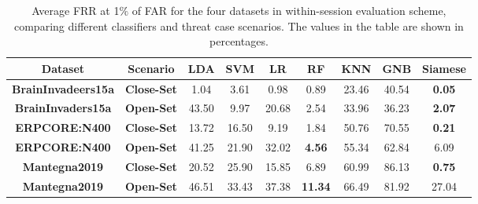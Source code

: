 \begin{table}[ht]
\caption{\large{Average FRR at 1$\%$ of FAR for the four datasets in within-session evaluation scheme, comparing different classifiers and  threat case scenarios. The values in the table are shown in percentages.}}

\label{tab:Table 3}
\renewcommand\arraystretch{1.2}
\resizebox{\textwidth}{!}
    {
\begin{tabular}{cc|ccccccc}

\hline

\rule{0pt}{25pt} \textbf{Dataset} & \textbf{Scenario} & \textbf{LDA} & \textbf{SVM} & \textbf{LR} & \textbf{RF} & \textbf{KNN} & \textbf{GNB} & \textbf{Siamese}\\

\hline
\rule{0pt}{25pt} \textbf{BrainInvadeers15a} & \textbf{Close-Set} & 1.04 & 3.61 & 0.98 & 0.89 & 23.46 & 40.54 & 
\textbf{0.05}\\
\rule{0pt}{25pt} \textbf{BrainInvaders15a} & \textbf{Open-Set}& 43.50 & 9.97 & 20.68 & 2.54 & 33.96 & 36.23 & \textbf{2.07}\\
\hline

\rule{0pt}{25pt} \textbf{ERPCORE:N400} & \textbf{Close-Set} & 13.72 & 16.50 & 9.19 & 1.84 & 50.76 & 70.55 & \textbf{0.21}\\
\rule{0pt}{25pt} \textbf{ERPCORE:N400} & \textbf{Open-Set}& 41.25 & 21.90 & 32.02 & \textbf{4.56} & 55.34 & 62.84 & 6.09\\
\hline

\rule{0pt}{25pt} \textbf{Mantegna2019} & \textbf{Close-Set} & 20.52 & 25.90 & 15.85 & 6.89 & 60.99 & 86.13 & \textbf{0.75}\\
\rule{0pt}{25pt} \textbf{Mantegna2019} & \textbf{Open-Set}& 46.51 & 33.43 & 37.38 & \textbf{11.34} & 66.49 & 81.92 & 27.04\\
\hline


\end{tabular}}
\end{table}
